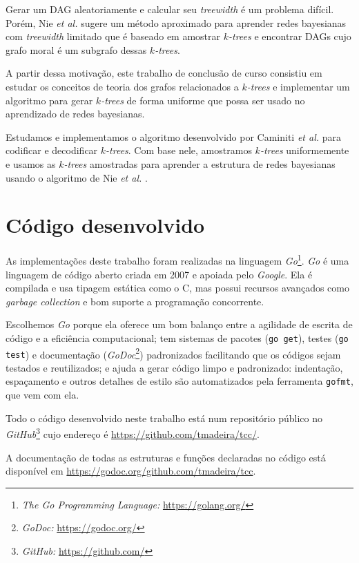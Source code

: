 Gerar um DAG aleatoriamente e calcular seu \emph{treewidth} é um problema difícil. Porém, Nie \emph{et al.} \cite{maua} sugere um método aproximado para aprender redes bayesianas com \emph{treewidth} limitado que é baseado em amostrar \emph{$k$-trees} e encontrar DAGs cujo grafo moral é um subgrafo dessas \emph{$k$-trees}.

A partir dessa motivação, este trabalho de conclusão de curso consistiu em estudar os conceitos de teoria dos grafos relacionados a \emph{$k$-trees} e implementar um algoritmo para gerar \emph{$k$-trees} de forma uniforme que possa ser usado no aprendizado de redes bayesianas.

Estudamos e implementamos o algoritmo desenvolvido por Caminiti \emph{et al.} \cite{caminiti} para codificar e decodificar \emph{$k$-trees}. Com base nele, amostramos \emph{$k$-trees} uniformemente e usamos as \emph{$k$-trees} amostradas para aprender a estrutura de redes bayesianas usando o algoritmo de Nie \emph{et al.} \cite{maua}.

\section{Código desenvolvido}

As implementações deste trabalho foram realizadas na linguagem \emph{Go}\footnote{\emph{The Go Programming Language:} \url{https://golang.org/}}. \emph{Go} é uma linguagem de código aberto criada em 2007 e apoiada pelo \emph{Google}. Ela é compilada e usa tipagem estática como o C, mas possui recursos avançados como \emph{garbage collection} e bom suporte a programação concorrente.

Escolhemos \emph{Go} porque ela oferece um bom balanço entre a agilidade de escrita de código e a eficiência computacional; tem sistemas de pacotes ({\tt go get}), testes ({\tt go test}) e documentação (\emph{GoDoc}\footnote{\emph{GoDoc:} \url{https://godoc.org/}}) padronizados facilitando que os códigos sejam testados e reutilizados; e ajuda a gerar código limpo e padronizado: indentação, espaçamento e outros detalhes de estilo são automatizados pela ferramenta {\tt gofmt}, que vem com ela.

Todo o código desenvolvido neste trabalho está num repositório público no \emph{GitHub}\footnote{\emph{GitHub:} \url{https://github.com/}} cujo endereço é \url{https://github.com/tmadeira/tcc/}.

A documentação de todas as estruturas e funções declaradas no código está disponível em \url{https://godoc.org/github.com/tmadeira/tcc}.

